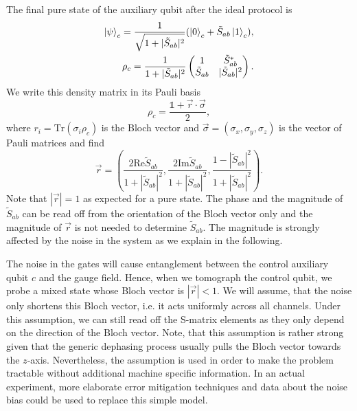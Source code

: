 \documentclass[two column]{article}
\begin{document}
The final pure state of the auxiliary qubit after the ideal protocol is
\begin{equation}
\begin{split}
    \ket{\psi}_c = \frac{1}{\sqrt{1+|\tilde{S}_{ab}|^2}}(\ket{0}_c + \tilde{S}_{ab}\ket{1}_c),\\
    \rho_c = \frac{1}{1+|\tilde{S}_{ab}|^2}\begin{pmatrix}
    1 & \tilde{S}_{ab}^* \\
    \tilde{S}_{ab} & |\tilde{S}_{ab}|^2
    \end{pmatrix}.
\end{split}
\end{equation}
We write this density matrix in its Pauli basis 
\begin{equation}
    \rho_c = \frac{\mathbb{1} + \vec{r} \cdot \vec{\sigma}}{2},
\end{equation}
where  $r_i = \text{Tr}(\sigma_i\rho_c)$ is the Bloch vector and $\vec{\sigma} = (\sigma_x, \sigma_y, \sigma_z)$ is the vector of Pauli matrices and find
\begin{equation}
    \vec{r} = \left( \frac{2 \text{Re}\tilde{S}_{ab}}{1+|\tilde{S}_{ab}|^2}, \frac{2 \text{Im}\tilde{S}_{ab}}{1+|\tilde{S}_{ab}|^2}, \frac{1 - |\tilde{S}_{ab}|^2}{1+|\tilde{S}_{ab}|^2} \right).\label{eqn:bloch}
\end{equation}
Note that $|\vec{r}| = 1$ as expected for a pure state. The phase and the magnitude of $\tilde S_{ab}$ can be read off from the orientation of the Bloch vector only and the magnitude of $\vec r$ is not needed to determine $\tilde S_{ab}$. The magnitude is strongly affected by the noise in the system as we explain in the following.

The noise in the gates will cause entanglement between the control auxiliary qubit $c$ and the gauge field. Hence, when we tomograph the control qubit, we probe a mixed state whose Bloch vector is $|\vec{r}|< 1$. We will assume, that the noise only shortens this Bloch vector, i.e. it acts uniformly across all channels. Under this assumption, we can still read off the S-matrix elements as they only depend on the direction of the Bloch vector. Note, that this assumption is rather strong given that the generic dephasing process usually pulls the Bloch vector towards the $z$-axis. Nevertheless, the assumption is used in order to make the problem tractable without additional machine specific information. In an actual experiment, more elaborate error mitigation techniques and data about the noise bias could be used to replace this simple model.
\end{document}
